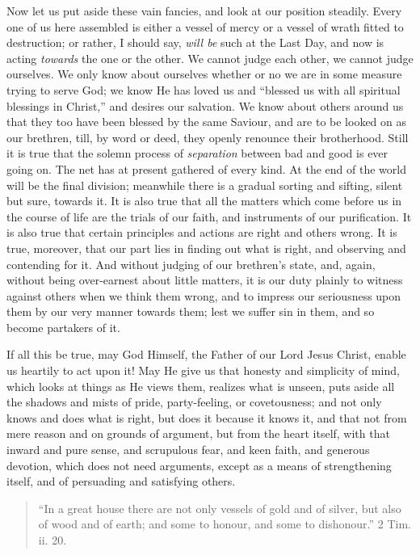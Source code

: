 Now let us put aside these vain fancies, and look at our position
steadily. Every one of us here assembled is either a vessel of mercy
or a vessel of wrath fitted to destruction; or rather, I should say, \emph{will
be} such at the Last Day, and now is acting \emph{towards} the one
or the other. We cannot judge each other, we cannot judge ourselves.
We only know about ourselves whether or no we are in some measure
trying to serve God; we know He has loved us and ``blessed us with
all spiritual blessings in Christ,'' and desires our salvation. We
know about others around us that they too have been blessed by the
same Saviour, and are to be looked on as our brethren, till, by word
or deed, they openly renounce their brotherhood. Still it is true that
the solemn process of \emph{separation} between bad and good is ever
going on. The net has at present gathered of every kind. At the end of
the world will be the final division; meanwhile there is a gradual
sorting and sifting, silent but sure, towards it. It is also true that
all the matters which come before us in the course of life are the
trials of our faith, and instruments of our purification. It is also
true that certain principles and actions are right and others wrong.
It is true, moreover, that our part lies in finding out what is right,
and observing and contending for it. And without judging of our
brethren's state, and, again, without being over-earnest about
little matters, it is our duty plainly to witness against others when
we think them wrong, and to impress our seriousness upon them by our
very manner towards them; lest we suffer sin in them, and so become
partakers of it.

If all this be true, may God Himself, the Father of our Lord Jesus
Christ, enable us heartily to act upon it! May He give us that honesty
and simplicity of mind, which looks at things as He views them,
realizes what is unseen, puts aside all the shadows and mists of
pride, party-feeling, or covetousness; and not only knows and does
what is right, but does it because it knows it, and that not from mere
reason and on grounds of argument, but from the heart itself, with
that inward and pure sense, and scrupulous fear, and keen faith, and
generous devotion, which does not need arguments, except as a means of
strengthening itself, and of persuading and satisfying others.


\begin{quote}

``In a great house there are not only vessels of gold and of
silver, but also of wood and of earth; and some to honour, and some
to dishonour.'' 2 Tim. ii. 20.

\end{quote}

